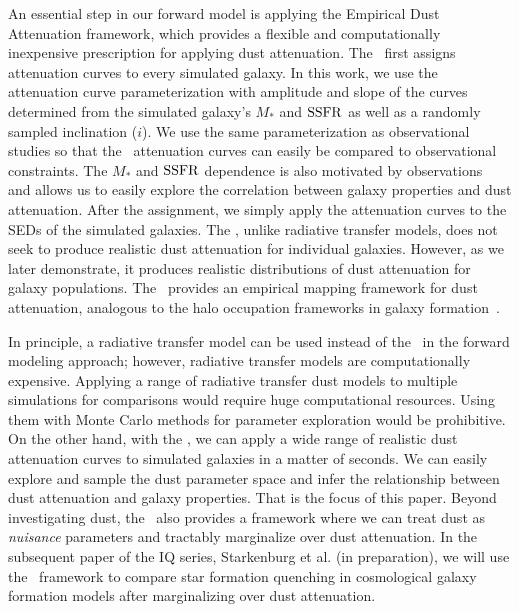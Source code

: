 An essential step in our forward model is applying the Empirical Dust
Attenuation framework, which provides a flexible and computationally
inexpensive prescription for applying dust attenuation.  
The \eda~first assigns attenuation curves to every simulated galaxy. 
In this work, we use the \cite{noll2009} attenuation curve parameterization
with amplitude and slope of the curves determined from
the simulated galaxy's $M_*$ and ${\rm SSFR}$ as well as a randomly sampled inclination ($i$). 
We use the same parameterization as observational studies so that the
\eda~attenuation curves can easily be compared to observational constraints. 
The $M_*$ and ${\rm SSFR}$ dependence is also motivated by
observations~\citep[\eg~][]{garn2010, wild2011, battisti2016, leja2017,
salim2018, salim2020} and allows us to easily explore the correlation
between galaxy properties and dust attenuation.
After the assignment, we simply apply the attenuation curves to the SEDs of
the simulated galaxies.
The \eda, unlike radiative transfer models, does not seek to produce realistic
dust attenuation for individual galaxies. 
However, as we later demonstrate, it produces realistic distributions of
dust attenuation for galaxy populations. 
The \eda~provides an empirical mapping framework for dust attenuation,
analogous to the halo occupation frameworks in galaxy formation~\citep[for a
review see ][]{wechsler2018}. 

In principle, a radiative transfer model can be used instead of the \eda~in
the forward modeling approach; however, radiative transfer models are computationally expensive.  
Applying a range of radiative transfer dust models to multiple simulations
for comparisons would require huge computational resources.
Using them with Monte Carlo methods for parameter exploration would be
prohibitive.  
On the other hand, with the \eda, we can apply a wide range of realistic
dust attenuation curves to simulated galaxies in a matter of seconds. 
We can easily explore and sample the dust parameter space and infer the
relationship between dust attenuation and galaxy properties. 
That is the focus of this paper. 
Beyond investigating dust, the \eda~also provides a framework where we can
treat dust as {\em nuisance} parameters and tractably marginalize over dust
attenuation. 
In the subsequent paper of the IQ series, Starkenburg et al. (in
preparation), we will use the \eda~framework to compare star formation
quenching in cosmological galaxy formation models after marginalizing over
dust attenuation. 

